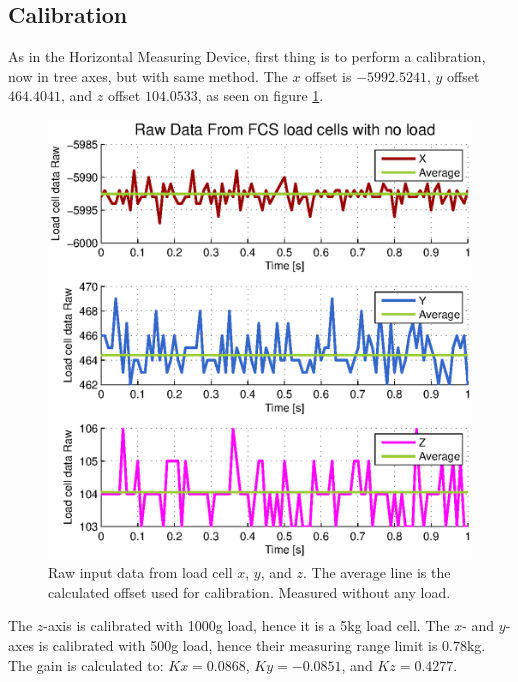 \subsection{Calibration}
As in the Horizontal Measuring Device, first thing is to perform a calibration, now in tree axes, but with same method. The $x$ offset is $-5992.5241$, $y$ offset $464.4041$, and $z$ offset $104.0533$, as seen on figure \ref{fig:fcs-calib-offset}.\\

\begin{figure}[hbtp]
\centering
\includegraphics[scale=1]{graphics/fcs_test/fcs_calib.eps}
\caption[Raw input data from load cell $x$, $y$, and $z$.]{Raw input data from load cell $x$, $y$, and $z$. The average line is the calculated offset used for calibration. Measured without any load.}
\label{fig:fcs-calib-offset}
\end{figure}

\noindent
The $z$-axis is calibrated with 1000g load, hence it is a 5kg load cell. The $x$- and $y$-axes is calibrated with 500g load, hence their measuring range limit is $0.78$kg. The gain is calculated to: $Kx=0.0868$, $Ky=-0.0851$, and $Kz=0.4277$. 
\\

\newpage
